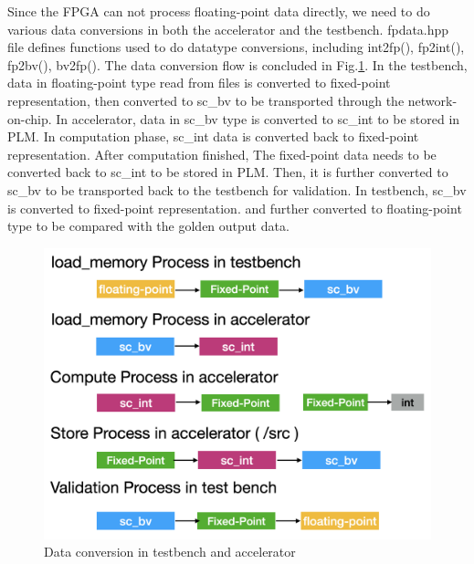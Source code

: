 \documentclass{sig-alternate}
\begin{document}
Since the FPGA can not process floating-point data directly, we need to do various data conversions in both the accelerator and the testbench. fpdata.hpp file defines functions used to do datatype conversions, including int2fp(), fp2int(), fp2bv(), bv2fp(). The data conversion flow is concluded in Fig.\ref{fig-data-convert}. In the testbench, data in floating-point type read from files is converted to fixed-point representation, then converted to sc\_bv to be transported through the network-on-chip. In accelerator, data in sc\_bv  type is converted to sc\_int to be stored in PLM. In computation phase, sc\_int data is converted back to fixed-point representation. After computation finished, The fixed-point data needs to be converted back to sc\_int to be stored in PLM. Then, it is further converted to sc\_bv to be transported back to the testbench for validation. In testbench, sc\_bv is converted to fixed-point representation. and further converted to floating-point type to be compared with the golden output data. \\
\begin{figure}[t]
\centering
\captionsetup{justification=centering, format=hang}
\includegraphics[width=0.85\columnwidth]{figure/data-conversion.png}
\caption{Data conversion in testbench and accelerator}
\label{fig-data-convert}
\end{figure}
\end{document}
